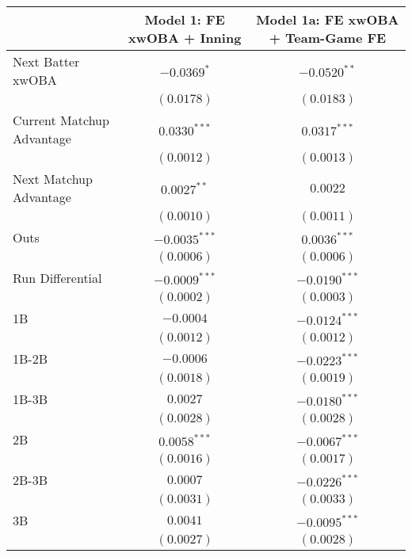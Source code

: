 
\begin{tabular}{l c c}
\toprule
 & Model 1: FE xwOBA + Inning & Model 1a: FE xwOBA + Team-Game FE \\
\midrule
Next Batter xwOBA                & $-0.0369^{*}$   & $-0.0520^{**}$  \\
                                 & $(0.0178)$      & $(0.0183)$      \\
Current Matchup Advantage        & $0.0330^{***}$  & $0.0317^{***}$  \\
                                 & $(0.0012)$      & $(0.0013)$      \\
Next Matchup Advantage           & $0.0027^{**}$   & $0.0022$        \\
                                 & $(0.0010)$      & $(0.0011)$      \\
Outs                             & $-0.0035^{***}$ & $0.0036^{***}$  \\
                                 & $(0.0006)$      & $(0.0006)$      \\
Run Differential                 & $-0.0009^{***}$ & $-0.0190^{***}$ \\
                                 & $(0.0002)$      & $(0.0003)$      \\
1B                               & $-0.0004$       & $-0.0124^{***}$ \\
                                 & $(0.0012)$      & $(0.0012)$      \\
1B-2B                            & $-0.0006$       & $-0.0223^{***}$ \\
                                 & $(0.0018)$      & $(0.0019)$      \\
1B-3B                            & $0.0027$        & $-0.0180^{***}$ \\
                                 & $(0.0028)$      & $(0.0028)$      \\
2B                               & $0.0058^{***}$  & $-0.0067^{***}$ \\
                                 & $(0.0016)$      & $(0.0017)$      \\
2B-3B                            & $0.0007$        & $-0.0226^{***}$ \\
                                 & $(0.0031)$      & $(0.0033)$      \\
3B                               & $0.0041$        & $-0.0095^{***}$ \\
                                 & $(0.0027)$      & $(0.0028)$      \\

\end{tabular}
